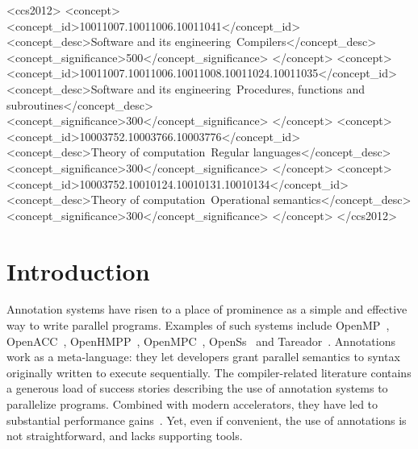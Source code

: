 \documentclass[sigplan,10pt,review,anonymous]{acmart}
\begin{document}
 \begin{CCSXML}
<ccs2012>
<concept>
<concept_id>10011007.10011006.10011041</concept_id>
<concept_desc>Software and its engineering~Compilers</concept_desc>
<concept_significance>500</concept_significance>
</concept>
<concept>
<concept_id>10011007.10011006.10011008.10011024.10011035</concept_id>
<concept_desc>Software and its engineering~Procedures, functions and subroutines</concept_desc>
<concept_significance>300</concept_significance>
</concept>
<concept>
<concept_id>10003752.10003766.10003776</concept_id>
<concept_desc>Theory of computation~Regular languages</concept_desc>
<concept_significance>300</concept_significance>
</concept>
<concept>
<concept_id>10003752.10010124.10010131.10010134</concept_id>
<concept_desc>Theory of computation~Operational semantics</concept_desc>
<concept_significance>300</concept_significance>
</concept>
</ccs2012>
\end{CCSXML}



\maketitle

\section{Introduction}
\label{sec:intro}

Annotation systems have risen to a place of prominence as a simple and
effective way to write parallel programs.
Examples of such systems include OpenMP~\cite{JaegerCP15},
OpenACC~\cite{OpenACC20}, OpenHMPP~\cite{Andion14}, OpenMPC~\cite{Lee10},
OpenSs~\cite{MeenderinckJ11} and Tareador~\cite{Ayguade15}.
Annotations work as a meta-language: they let developers grant parallel
semantics to syntax originally written to execute sequentially.
The compiler-related literature contains a generous load of success stories
describing the use of annotation systems to parallelize programs.
Combined with modern accelerators, they have led to substantial performance
gains~\cite{Bertolli14,Mendonca17,Poesia17,Reyes12,Wienke12}.
Yet, even if convenient, the use of annotations is not straightforward, and
lacks supporting tools.
\end{document}
